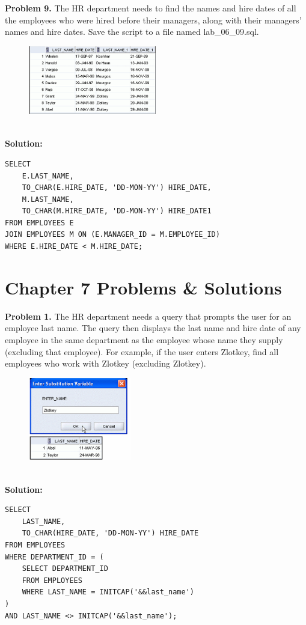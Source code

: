 \documentclass[12pt,a4paper]{article}
\begin{document}
\vspace{0.5cm}

\textbf{Problem 9.} The HR department needs to find the names and hire dates of all the employees who were hired before their managers, along with their managers' names and hire dates. Save the script to a file named lab\_06\_09.sql.
\begin{figure}[htbp]
  \centering
  \includegraphics[width=0.5\textwidth]{Screenshots/69.png}
\end{figure}\\
\textbf{Solution:}
\begin{lstlisting}[style=sqlstyle]
SELECT 
    E.LAST_NAME,
    TO_CHAR(E.HIRE_DATE, 'DD-MON-YY') HIRE_DATE,
    M.LAST_NAME,
    TO_CHAR(M.HIRE_DATE, 'DD-MON-YY') HIRE_DATE1
FROM EMPLOYEES E
JOIN EMPLOYEES M ON (E.MANAGER_ID = M.EMPLOYEE_ID)
WHERE E.HIRE_DATE < M.HIRE_DATE;
\end{lstlisting}

\newpage

\section{Chapter 7 Problems \& Solutions}

\textbf{Problem 1.} The HR department needs a query that prompts the user for an employee last name. The query then displays the last name and hire date of any employee in the same department as the employee whose name they supply (excluding that employee). For example, if the user enters Zlotkey, find all employees who work with Zlotkey (excluding Zlotkey).
\begin{figure}[htbp]
  \centering
  \includegraphics[width=0.4\textwidth]{Screenshots/71.png}
\end{figure}\\
\textbf{Solution:}
\begin{lstlisting}[style=sqlstyle]
SELECT 
    LAST_NAME,
    TO_CHAR(HIRE_DATE, 'DD-MON-YY') HIRE_DATE
FROM EMPLOYEES
WHERE DEPARTMENT_ID = (
    SELECT DEPARTMENT_ID
    FROM EMPLOYEES
    WHERE LAST_NAME = INITCAP('&&last_name')
)
AND LAST_NAME <> INITCAP('&&last_name');
\end{lstlisting}
\end{document}

